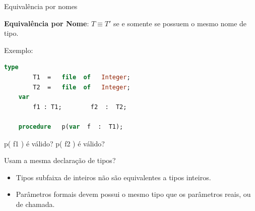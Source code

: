 \documentclass[handout]{beamer}
\begin{document}
\begin{frame}[fragile]{Equivalência por nomes}

\textbf{Equivalência por Nome}:   $T  \equiv  T'$  se e somente se  possuem o mesmo nome de tipo.

Exemplo:
\begin{lstlisting}[language=Pascal]
	type
		T1  =   file  of   Integer;
		T2  =   file  of   Integer;
	var
		f1 : T1;       	f2  :  T2;

	procedure   p(var  f  :  T1);
\end{lstlisting}


p( f1 )  é  válido?	p( f2 ) é válido?

Usam a mesma declaração de tipos?

\begin{itemize}
\item Tipos subfaixa de inteiros não são equivalentes a tipos inteiros.
\item Parâmetros formais devem possui o mesmo tipo que os parâmetros reais, ou de chamada.
\end{itemize}

\end{frame}
\end{document}
